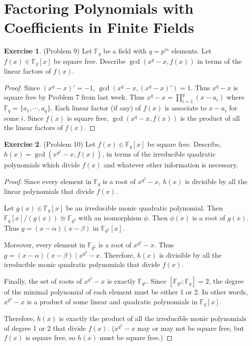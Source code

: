 \documentclass[12pt, psamsfonts]{amsart}
\theoremstyle{definition}
\newtheorem*{exer}{Exercise}
\theoremstyle{remark}
\numberwithin{equation}{section}
\begin{document}
\section{Factoring Polynomials with Coefficients in Finite Fields}

\begin{exer}{(Problem 9)}
  Let $\mathbb{F}_q$ be a field with $q = p^m$ elements.
  Let $f(x) \in \mathbb{F}_q[x]$ be square free.
  Describe $\gcd(x^q - x, f(x))$ in terms of the linear factors of $f(x)$.
\end{exer}

\begin{proof}
  Since $(x^q - x)' = -1$, $\gcd(x^q - x, (x^q - x)') = 1$.
  Thus $x^q - x$ is square free by Problem 7 from last week.
  Thus $x^q - x = \prod_{i=1}^{q} (x - a_i)$ where $\mathbb{F}_q = \{ a_1, \cdots, a_q \}$.
  Each linear factor (if any) of $f(x)$ is associate to $x - a_i$ for some $i$.
  Since $f(x)$ is square free, $\gcd(x^q - x, f(x))$ is the product of all the linear factors of $f(x)$.
\end{proof}

\begin{exer}{(Problem 10)}
  Let $f(x) \in \mathbb{F}_q[x]$ be square free.
  Describe, $h(x) = \gcd(x^{q^2} - x, f(x))$, in terms of the irreducible quadratic polynomials which divide $f(x)$ and whatever other information is necessary.
\end{exer}

\begin{proof}
  Since every element in $\mathbb{F}_q$ is a root of $x^{q^2} - x$, $h(x)$ is divisible by all the linear polynomials that divide $f(x)$.

  Let $g(x) \in \mathbb{F}_q[x]$ be an irreducible monic quadratic polynomial.
  Then $\mathbb{F}_q[x]/(g(x)) \cong \mathbb{F}_{q^2}$ with an isomorphism $\phi$.
  Then $\phi(x)$ is a root of $g(x)$.
  Thus $g = (x - \alpha)(x - \beta)$ in $\mathbb{F}_{q^2}[x]$.

  Moreover, every element in $\mathbb{F}_{q^2}$ is a root of $x^{q^2} - x$.
  Thus $g = (x - \alpha)(x - \beta) \mid x^{q^2} - x$.
  Therefore, $h(x)$ is divisible by all the irreducible monic quadratic polynomials that divide $f(x)$.

  Finally, the set of roots of $x^{q^2} - x$ is exactly $\mathbb{F}_{q^2}$.
  Since $[\mathbb{F}_{q^2}:\mathbb{F}_q] = 2$, the degree of the minimal polynomial of each element must be either 1 or 2.
  In other words, $x^{q^2} - x$ is a product of some linear and quadratic polynomials in $\mathbb{F}_q[x]$.

  Therefore, $h(x)$ is exactly the product of all the irreducible monic polynomials of degree 1 or 2 that divide $f(x)$.
  ($x^{q^2} - x$ may or may not be square free, but $f(x)$ is square free, so $h(x)$ must be square free.)
\end{proof}
\end{document}
